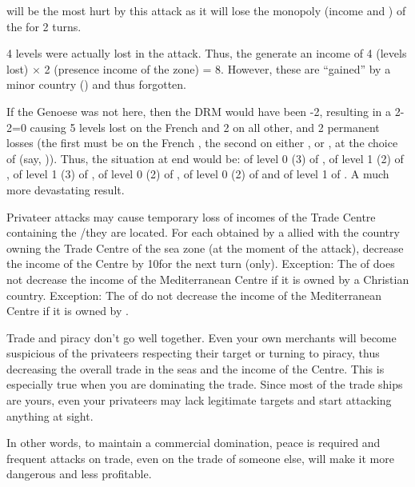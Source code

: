 \begin{exemple}
  \FRA will be the most hurt by this attack as it will lose the monopoly
  (income and \VPs) of the \STZ for 2 turns.

  4 levels were actually lost in the attack. Thus, the \corsaire generate an
  income of 4 (levels lost) $\times$ 2 (presence income of the zone) =
  8\ducats. However, these are ``gained'' by a minor country (\paysAlgerie)
  and thus forgotten.

  \smallskip

  If the Genoese \FLEET was not here, then the DRM would have been -2,
  resulting in a 2-2=0 causing 5 levels lost on the French \TradeFLEET and 2
  on all other, and 2 permanent losses (the first must be on the French
  \TradeFLEET, the second on either \FRA, \paysGenes or \paysHollande, at the
  choice of \TUR (say, \paysGenes)). Thus, the situation at end would be:
  \TradeFLEET\facemoins of level 0 (3) of \FRA, \TradeFLEET\facemoins of level
  1 (2) of \paysGenes, \TradeFLEET\facemoins of level 1 (3) of \paysHollande,
  \TradeFLEET\facemoins of level 0 (2) of \HIS, \TradeFLEET\facemoins of level
  0 (2) of \VEN and \TradeFLEET\facemoins of level 1 of \TUR. A much more
  devastating result.
\end{exemple}

\bparag Privateer attacks may cause temporary loss of incomes of the Trade
Centre containing the \STZ/\CTZ they are located.
\bparag For each \textetoile obtained by a \corsaire allied with the country
owning the Trade Centre of the sea zone (at the moment of the attack),
decrease the income of the Centre by 10\ducats for the next turn (only).
\bparag Exception: The \corsaire of  does not decrease the
income of the Mediterranean Centre if it is owned by a Christian country.
\bparag Exception: The \corsaire of \Barbaresques do not decrease the income
of the Mediterranean Centre if it is owned by \TUR.

\begin{designnote}
  Trade and piracy don't go well together. Even your own merchants will become
  suspicious of the privateers respecting their target or turning to piracy,
  thus decreasing the overall trade in the seas and the income of the
  Centre. This is especially true when you are dominating the trade. Since
  most of the trade ships are yours, even your privateers may lack legitimate
  targets and start attacking anything at sight.

  In other words, to maintain a commercial domination, peace is required and
  frequent attacks on trade, even on the trade of someone else, will make it
  more dangerous and less profitable.
\end{designnote}


